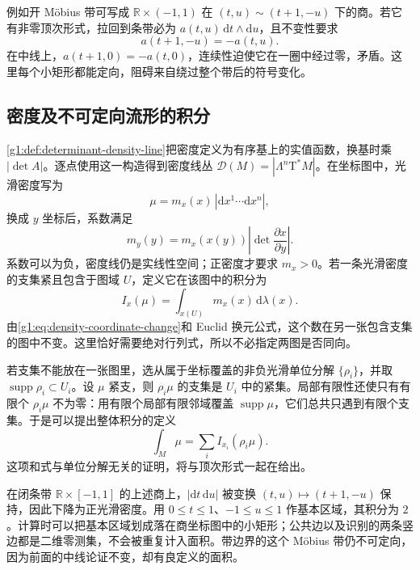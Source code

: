 例如开 Möbius 带可写成 \(\mathbb R\times(-1,1)\) 在 \((t,u)\sim(t+1,-u)\) 下的商。若它有非零顶次形式，拉回到条带必为 \(a(t,u)\,\mathrm{d}t\wedge\mathrm{d}u\)，且不变性要求
\[
	a(t+1,-u)=-a(t,u).
\]
在中线上，\(a(t+1,0)=-a(t,0)\)，连续性迫使它在一圈中经过零，矛盾。这里每个小矩形都能定向，阻碍来自绕过整个带后的符号变化。

\subsection{密度及不可定向流形的积分}
\label{g1:subsec:1403:02}

\cref{g1:def:determinant-density-line}把密度定义为有序基上的实值函数，换基时乘 \(|\det A|\)。逐点使用这一构造得到密度线丛 \(\mathcal D(M)=|\Lambda^n\mathrm{T}^*M|\)。在坐标图中，光滑密度写为
\[
	\mu=m_x(x)\,|\mathrm{d}x^1\cdots\mathrm{d}x^n|,
\]
换成 \(y\) 坐标后，系数满足
\begin{equation}\label{g1:eq:density-coordinate-change}
	m_y(y)=m_x(x(y))\left|\det\frac{\partial x}{\partial y}\right|.
\end{equation}
系数可以为负，密度线仍是实线性空间；正密度才要求 \(m_x>0\)。若一条光滑密度的支集紧且包含于图域 \(U\)，定义它在该图中的积分为
\[
	I_x(\mu)=\int_{x(U)}m_x(x)\,\mathrm{d}\lambda(x).
\]
由\eqref{g1:eq:density-coordinate-change}和 Euclid 换元公式，这个数在另一张包含支集的图中不变。这里恰好需要绝对行列式，所以不必指定两图是否同向。

\ProseParagraphBreak

若支集不能放在一张图里，选从属于坐标覆盖的非负光滑单位分解 \(\{\rho_i\}\)，并取 \(\operatorname{supp}\rho_i\subset U_i\)。设 \(\mu\) 紧支，则 \(\rho_i\mu\) 的支集是 \(U_i\) 中的紧集。局部有限性还使只有有限个 \(\rho_i\mu\) 不为零：用有限个局部有限邻域覆盖 \(\operatorname{supp}\mu\)，它们总共只遇到有限个支集。于是可以提出整体积分的定义
\begin{equation}\label{g1:eq:density-integral-definition}
	\int_M\mu=\sum_i I_{x_i}(\rho_i\mu).
\end{equation}
这项和式与单位分解无关的证明，将与顶次形式一起在给出。

\begin{example}
	\label{g1:exm:mobius-density-integral}
	在闭条带 \(\mathbb R\times[-1,1]\) 的上述商上，\(|\mathrm{d}t\,\mathrm{d}u|\) 被变换 \((t,u)\mapsto(t+1,-u)\) 保持，因此下降为正光滑密度。用 \(0\leq t\leq1\)、\(-1\leq u\leq1\) 作基本区域，其积分为 \(2\)。计算时可以把基本区域划成落在商坐标图中的小矩形；公共边以及识别的两条竖边都是二维零测集，不会被重复计入面积。带边界的这个 Möbius 带仍不可定向，因为前面的中线论证不变，却有良定义的面积。
\end{example}

